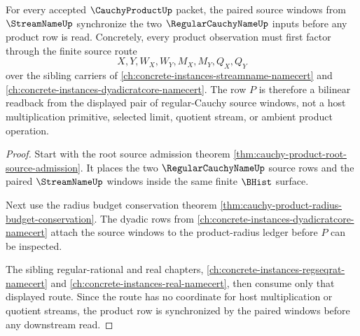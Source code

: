 \begin{theorem}
\label{thm:cauchy-product-source-window-bilinear-synchronization}
For every accepted $\CauchyProductUp$ packet, the paired source windows from $\StreamNameUp$ synchronize the two $\RegularCauchyNameUp$ inputs before any product row is read. Concretely, every product observation must first factor through the finite source route
$$
X,Y,W_X,W_Y,M_X,M_Y,Q_X,Q_Y
$$
over the sibling carriers of \autoref{ch:concrete-instances-streamname-namecert} and \autoref{ch:concrete-instances-dyadicratcore-namecert}. The row $P$ is therefore a bilinear readback from the displayed pair of regular-Cauchy source windows, not a host multiplication primitive, selected limit, quotient stream, or ambient product operation.
\end{theorem}
\begin{proof}
Start with the root source admission theorem \autoref{thm:cauchy-product-root-source-admission}. It places the two $\RegularCauchyNameUp$ source rows and the paired $\StreamNameUp$ windows inside the same finite $\BHist$ surface.

Next use the radius budget conservation theorem \autoref{thm:cauchy-product-radius-budget-conservation}. The dyadic rows from \autoref{ch:concrete-instances-dyadicratcore-namecert} attach the source windows to the product-radius ledger before $P$ can be inspected.

The sibling regular-rational and real chapters, \autoref{ch:concrete-instances-regseqrat-namecert} and \autoref{ch:concrete-instances-real-namecert}, then consume only that displayed route. Since the route has no coordinate for host multiplication or quotient streams, the product row is synchronized by the paired windows before any downstream read.
\end{proof}

